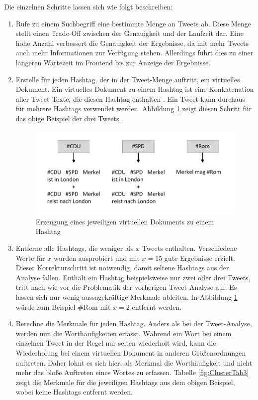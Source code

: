 Die einzelnen Schritte lassen sich wie folgt beschreiben:
\begin{enumerate}
\item Rufe zu einem Suchbegriff eine bestimmte Menge an Tweets ab. Diese Menge stellt einen Trade-Off zwi\-schen der Genauigkeit und der Laufzeit dar. Eine hohe Anzahl verbessert die Genauigkeit der Ergebnisse, da mit mehr Tweets auch mehr Informationen zur Verfügung stehen. Allerdings führt dies zu einer längeren Wartezeit im Frontend bis zur Anzeige der Ergebnisse.
%
\item Erstelle für jeden Hashtag, der in der Tweet-Menge auftritt, ein virtuelles Dokument. Ein virtuelles Dokument zu einem Hashtag ist eine Konkatenation aller Tweet-Texte, die diesen Hashtag enthalten \cite{TsurLittman}. Ein Tweet kann durchaus für mehrere Hashtags verwendet werden. Abbildung \ref{fig:HashtagClusteringSchritt2} zeigt diesen Schritt für das obige Beispiel der drei Tweets.
%
\begin{figure}[ht]
 \centering
 \includegraphics[scale=0.9]{./Bilder/Clustering/HashtagClusteringIdee.pdf}
\caption{Erzeugung eines jeweiligen virtuellen Dokuments zu einem Hashtag}
\label{fig:HashtagClusteringSchritt2}
\end{figure}
%
\item Entferne alle Hashtags, die weniger als $x$ Tweets enthalten. Verschiedene Werte für $x$ wurden ausprobiert und mit $x=15$ gute Ergebnisse erzielt. Dieser Korrekturschritt ist notwendig, damit seltene Hashtags aus der Analyse fallen. Enthält ein Hashtag beispielsweise nur zwei oder drei Tweets, tritt nach wie vor die Problematik der vorherigen Tweet-Analyse auf. Es lassen sich nur wenig aussagekräftige Merkmale ableiten. In Abbildung \ref{fig:HashtagClusteringSchritt2} würde zum Beispiel \glqq \#Rom\grqq{} mit $x=2$ entfernt werden.
%
\item Berechne die Merkmale für jeden Hashtag. Anders als bei der Tweet-Analyse, werden nun die Worthäufigkeiten erfasst.
Während ein Wort bei einem einzelnen Tweet in der Regel nur selten wiederholt wird, kann die Wiederholung bei einem virtuellen Dokument in anderen Größenordnungen auftreten. Daher lohnt es sich hier, als Merkmal die Worthäufigkeit und nicht mehr das bloße Auftreten eines Wortes zu erfassen. Tabelle \ref{fig:ClusterTab3} zeigt die Merkmale für die jeweiligen Hashtags aus dem obigen Beispiel, wobei keine Hashtags entfernt werden.
%
%


\end{enumerate}
